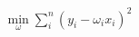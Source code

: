 \documentclass[preview]{standalone}
\begin{document}
\begin{align*}
\min_\omega \sum_i^n (y_i-\omega_ix_i)^2
\end{align*}
\end{document}
